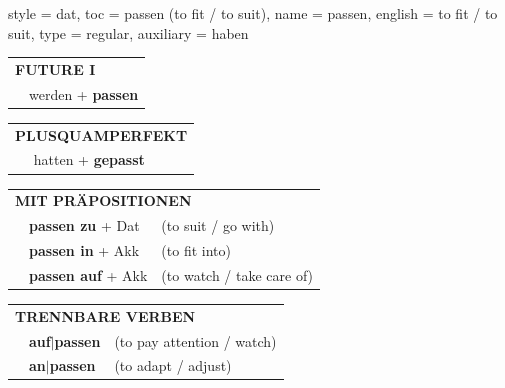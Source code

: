 \begin{verbentry}{
  style = {dat},
  toc = {passen (to fit / to suit)},
  name = {passen},
  english = {to fit / to suit},
  type = {regular},
  auxiliary = {haben}
}
\begin{tabular}{rl}
    \multicolumn{2}{l}{\textbf{FUTURE I} }\\
   & werden + \textbf{passen}\\
 
  \end{tabular}
\hfill
   \begin{tabular}{rl}
      \multicolumn{2}{l}{\textbf{PLUSQUAMPERFEKT}}\\
   & hatten + \textbf{gepasst}\\
  \end{tabular}

   \vspace{10pt}

   \begin{tabular}{lll}
      \multicolumn{3}{l}{\textbf{MIT PRÄPOSITIONEN}}\\
& \textbf{passen zu} + Dat & (to suit / go with)\\
& \textbf{passen in} + Akk & (to fit into)\\
& \textbf{passen auf} + Akk & (to watch / take care of)
\end{tabular}
  \hfill
   \begin{tabular}{lll}
      \multicolumn{3}{l}{\textbf{TRENNBARE VERBEN}}\\
 & \textbf{auf$|$passen} & (to pay attention / watch)\\
 & \textbf{an$|$passen} & (to adapt / adjust)\\
  \end{tabular}


  \vspace{-5pt}
\end{verbentry}

